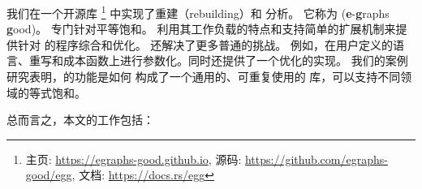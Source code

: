 我们在一个开源库 \footnote{
    主页: \url{https://egraphs-good.github.io},
    源码: \url{https://github.com/egraphs-good/egg},
    文档: \url{https://docs.rs/egg}
  } 中实现了重建（rebuilding）和 \eclass 分析。
  它称为 \egg (\textbf{e}-\textbf{g}raphs \textbf{g}ood)。
\Egg 专门针对平等饱和。
  利用其工作负载的特点和支持简单的扩展机制来提供针对 \egraphs 的程序综合和优化。
\Egg 还解决了更多普通的挑战。
  例如，在用户定义的语言、重写和成本函数上进行参数化。同时还提供了一个优化的实现。
我们的案例研究表明，\egg 的功能是如何
  构成了一个通用的、可重复使用的 \egraph 库，可以支持不同领域的等式饱和。

总而言之，本文的工作包括：

